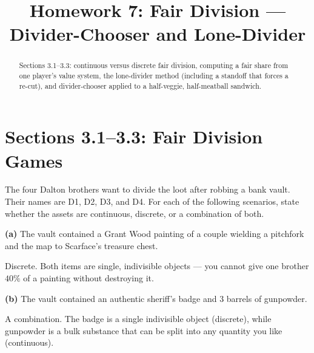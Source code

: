 \documentclass[12pt]{ximera}
\title{Homework 7: Fair Division --- Divider-Chooser and Lone-Divider}
\begin{document}
\begin{abstract}
Sections 3.1--3.3: continuous versus discrete fair division, computing a fair share
from one player's value system, the lone-divider method (including a standoff that
forces a re-cut), and divider-chooser applied to a half-veggie, half-meatball
sandwich.
\end{abstract}
\maketitle

\section*{Sections 3.1--3.3: Fair Division Games}

\begin{problem}
The four Dalton brothers want to divide the loot after robbing a bank vault. Their
names are D1, D2, D3, and D4. For each of the following scenarios, state whether the
assets are continuous, discrete, or a combination of both.

\begin{prompt}
\textbf{(a)} The vault contained a Grant Wood painting of a couple wielding a pitchfork
and the map to Scarface's treasure chest.

\begin{multipleChoice}
\end{multipleChoice}

\begin{solution}
Discrete. Both items are single, indivisible objects --- you cannot give one brother
$40\%$ of a painting without destroying it.
\end{solution}
\end{prompt}

\begin{prompt}
\textbf{(b)} The vault contained an authentic sheriff's badge and $3$ barrels of
gunpowder.

\begin{multipleChoice}
\end{multipleChoice}

\begin{solution}
A combination. The badge is a single indivisible object (discrete), while gunpowder
is a bulk substance that can be split into any quantity you like (continuous).
\end{solution}
\end{prompt}


\end{problem}
\end{document}

